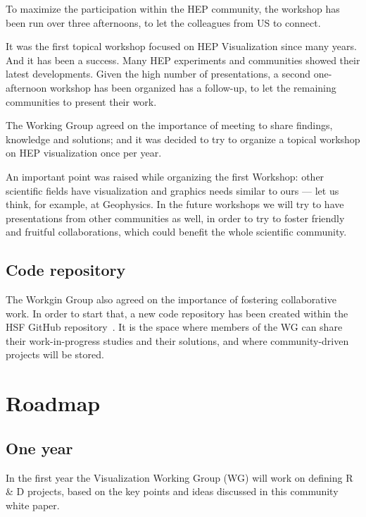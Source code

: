\documentclass[12pt,a4paper]{article}
\begin{document}
To maximize the participation within the HEP community, the workshop has been run over three afternoons, to let the
colleagues from US to connect.

It was the first topical workshop focused on HEP Visualization since many years. And it has been a success. Many HEP
experiments and communities showed their latest developments. Given the high number of presentations, a second one-afternoon
workshop has been organized has a follow-up, to let the remaining communities to present their work.

The Working Group agreed on the importance of meeting to share findings, knowledge and solutions; and it was decided to
try to organize a topical workshop on HEP visualization once per year.

An important point was raised while organizing the first Workshop: other scientific fields have visualization and
graphics needs similar to ours --- let us think, for example, at Geophysics. In the future workshops we will try to
have presentations from other communities as well, in order to try to foster friendly and fruitful collaborations,
which could benefit the whole scientific community.

\hypertarget{repo}{%
\subsection{Code repository}\label{repo}}

The Workgin Group also agreed on the importance of fostering collaborative work.
In order to start that, a new code repository has been created within the HSF GitHub repository~\cite{HSFVizRepo}.
It is the space where members of the WG can share their work-in-progress studies and their solutions, and where
community-driven projects will be stored.

\hypertarget{roadmap}{%
\section{Roadmap}\label{roadmap}}

\hypertarget{one-year}{%
\subsection{One year}\label{one-year}}

In the first year the Visualization Working Group (WG) will work on defining R \& D projects, based on the key
points and ideas discussed in this community white paper.
\end{document}
